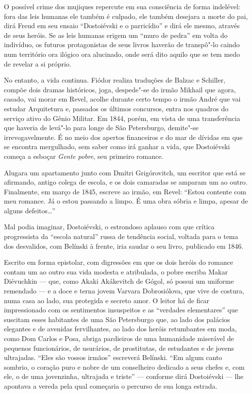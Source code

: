 O possível crime dos mujiques repercute em sua consciência de forma indelével:
fora das leis humanas ele também é culpado, ele também desejara a morte
do pai, dirá Freud em seu ensaio ``Dostoiévski e o parricídio'' e dirá
ele mesmo, através de seus heróis. Se as leis humanas erigem um ``muro
de pedra'' em volta do indivíduo, os futuros protagonistas de seus
livros haverão de transpô"-lo caindo num território ora ilógico ora
alucinado, onde será dito aquilo que se tem medo de revelar a si
próprio.

No entanto, a vida continua. Fiódor realiza traduções de Balzac e
Schiller, compõe dois dramas históricos, joga, despede"-se do irmão
Mikhail que agora, casado, vai morar em Revel, acolhe durante certo
tempo o irmão André que vai estudar Arquitetura e, passados os últimos
concursos, entra nos quadros do serviço ativo do Gênio Militar. Em 1844,
porém, em vista de uma transferência que haveria de levá"-lo para longe
de São Petersburgo, demite"-se irrevogavelmente. É no meio dos apertos
financeiros e do mar de dívidas em que se encontra mergulhado, sem saber
como irá ganhar a vida, que Dostoiévski começa a esboçar \emph{Gente
pobre}, seu primeiro romance.

Alugara um apartamento junto com Dmítri Grigórovitch, um escritor que
está se afirmando, antigo colega de escola, e os dois camaradas se
amparam um ao outro. Finalmente, em março de 1845, escreve ao irmão, em
Revel: ``Estou contente com meu romance. Já o estou passando a limpo.
É uma obra sóbria e limpa, apesar de alguns defeitos\ldots{}''

Mal podia imaginar, Dostoiévski, o estrondoso aplauso com que crítica
progressista da ``escola natural'' russa de tendência social, voltada
para o tema dos desvalidos, com Belínski à frente, iria saudar o seu
livro, publicado em 1846.

Escrito em forma epistolar, com digressões em que os dois heróis do
romance contam um ao outro sua vida modesta e atribulada, o pobre escriba Makar
Diévuchkin --- que, como Akaki Akákevitch de Gógol, só possui um
uniforme remendado --- e a doce e terna jovem Varvara Dobrosiólova,
que vive de costura, numa casa ao lado, sua protegida e secreto amor. O
leitor há de ficar impressionado com os sentimentos insuspeitos e as ``verdades elementares'' que suscitam esses habitantes de uma São
Petersburgo que, ao lado dos palácios elegantes e de
avenidas fervilhantes, ao lado dos heróis retumbantes em moda, como Dom
Carlos e Posa, abriga pardieiros de uma humanidade miserável
de pequenos funcionários, de usurários, de prostitutas, de estudantes e
de jovens ultrajadas. ``Eles são vossos irmãos'' escreverá Belínski.
``Em algum canto sombrio, o coração puro e nobre de um conselheiro
dedicado a seus chefes e, com ele, o de uma jovenzinha, ultrajada e
triste'' --- conforme dirá Dostoiévski --- lhe apontava a vereda pela qual
começaria o percurso de sua longa estrada.


